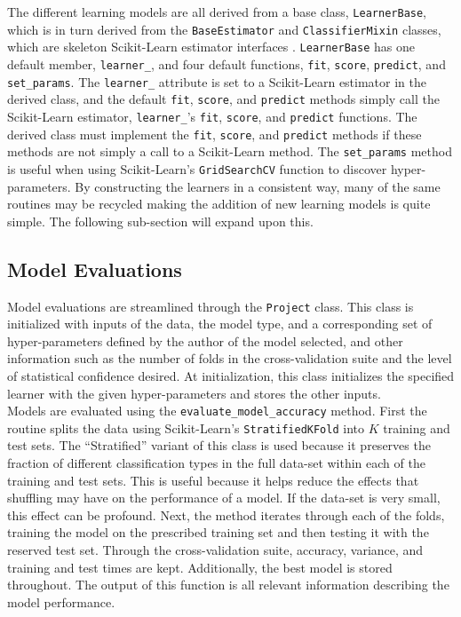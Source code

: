 \documentclass[paper=a4, fontsize=11pt]{scrartcl} %
\begin{document}
The different learning models are all derived from a base class, \verb|LearnerBase|, which is in turn derived from the \verb|BaseEstimator| and \verb|ClassifierMixin| classes, which are skeleton Scikit-Learn estimator interfaces \cite{scikit-learn}.
\verb|LearnerBase| has one default member, \verb|learner_|, and four default functions, \verb|fit|, \verb|score|, \verb|predict|, and \verb|set_params|.
The \verb|learner_| attribute is set to a Scikit-Learn estimator in the derived class, and the default \verb|fit|, \verb|score|, and \verb|predict| methods simply call the Scikit-Learn estimator, \verb|learner_|'s \verb|fit|, \verb|score|, and \verb|predict| functions.
The derived class must implement the \verb|fit|, \verb|score|, and \verb|predict| methods if these methods are not simply a call to a Scikit-Learn method.
The \verb|set_params| method is useful when using Scikit-Learn's \verb|GridSearchCV| function to discover hyper-parameters.
By constructing the learners in a consistent way, many of the same routines may be recycled making the addition of new learning models is quite simple.
The following sub-section will expand upon this.
\\

\subsection*{Model Evaluations}

Model evaluations are streamlined through the \verb|Project| class.
This class is initialized with inputs of the data, the model type, and a corresponding set of hyper-parameters defined by the author of the model selected, and other information such as the number of folds in the cross-validation suite and the level of statistical confidence desired.
At initialization, this class initializes the specified learner with the given hyper-parameters and stores the other inputs.
\\

Models are evaluated using the \verb|evaluate_model_accuracy| method.
First the routine splits the data using Scikit-Learn's \verb|StratifiedKFold| into $K$ training and test sets.
The ``Stratified'' variant of this class is used because it preserves the fraction of different classification types in the full data-set within each of the training and test sets.
This is useful because it helps reduce the effects that shuffling may have on the performance of a model.
If the data-set is very small, this effect can be profound.
Next, the method iterates through each of the folds, training the model on the prescribed training set and then testing it with the reserved test set.
Through the cross-validation suite, accuracy, variance, and training and test times are kept.
Additionally, the best model is stored throughout.
The output of this function is all relevant information describing the model performance.
\end{document}
